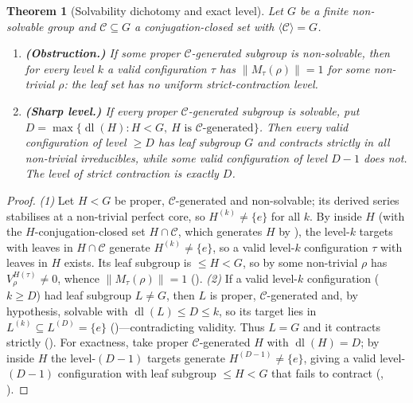 \documentclass[11pt]{amsart}
\newtheorem{theorem}{Theorem}[section]
\theoremstyle{definition}
\theoremstyle{remark}
\theoremstyle{plain}
\theoremstyle{plain}
\numberwithin{equation}{section}
\newcommand{\norm}[1]{\lVert #1 \rVert}
\newcommand{\opn}[1]{\norm{#1}}
\begin{document}
\begin{theorem}[Solvability dichotomy and exact level]
\label{thm:dichotomy}
Let $G$ be a finite non-solvable group and $\mathcal{C}\subseteq G$ a
conjugation-closed set with $\langle\mathcal{C}\rangle=G$.
\begin{enumerate}[nosep,leftmargin=1.6em]
\item\textbf{(Obstruction.)} If some proper $\mathcal{C}$-generated subgroup is
non-solvable, then for every level $k$ a valid configuration $\tau$ has $\opn{M_\tau(\rho)}=1$
for some non-trivial $\rho$: the leaf set has \emph{no uniform strict-contraction level}.
\item\textbf{(Sharp level.)} If every proper $\mathcal{C}$-generated subgroup is solvable,
put $D=\max\{\operatorname{dl}(H):H<G,\ H\text{ is }\mathcal{C}\text{-generated}\}$. Then
every valid configuration of level $\ge D$ has leaf subgroup $G$ and contracts strictly in
all non-trivial irreducibles, while some valid configuration of level $D-1$ does not. The
level of strict contraction is exactly $D$.
\end{enumerate}
\end{theorem}
\begin{proof}
\emph{(1)} Let $H<G$ be proper, $\mathcal{C}$-generated and non-solvable; its derived
series stabilises at a non-trivial perfect core, so $H^{(k)}\neq\{e\}$ for all $k$. By
 inside $H$ (with the $H$-conjugation-closed set $H\cap\mathcal{C}$,
which generates $H$ by ), the level-$k$ targets with leaves in
$H\cap\mathcal{C}$ generate $H^{(k)}\neq\{e\}$, so a valid level-$k$ configuration $\tau$ with
leaves in $H$ exists. Its leaf subgroup is $\le H<G$, so by  some
non-trivial $\rho$ has $V_\rho^{H(\tau)}\neq0$, whence
$\opn{M_\tau(\rho)}=1$ (). \emph{(2)} If a valid level-$k$ configuration
($k\ge D$) had leaf subgroup $L\neq G$, then $L$ is proper, $\mathcal{C}$-generated and,
by hypothesis, solvable with $\operatorname{dl}(L)\le D\le k$, so its target lies in
$L^{(k)}\subseteq L^{(D)}=\{e\}$ ()---contradicting validity. Thus $L=G$
and it contracts strictly (). For exactness, take proper
$\mathcal{C}$-generated $H$ with $\operatorname{dl}(H)=D$; by  inside $H$
the level-$(D-1)$ targets generate $H^{(D-1)}\neq\{e\}$, giving a valid level-$(D-1)$
configuration with leaf subgroup $\le H<G$ that fails to contract (,
).
\end{proof}
\end{document}
